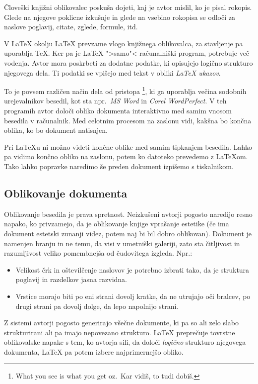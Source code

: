 Človeški knjižni oblikovalec poskuša dojeti, kaj je avtor mislil, 
ko je pisal rokopis. Glede na njegove poklicne izkušnje in glede na 
vsebino rokopisa 
se odloči za naslove poglavij, citate, zglede, formule, itd.

V \LaTeX{} okolju \LaTeX{} prevzame vlogo knjižnega oblikovalca, za stavljenje
pa uporablja \TeX{}. Ker pa je \LaTeX{}  ">samo"< računalniški program, 
potrebuje več vodenja. Avtor mora poskrbeti za dodatne podatke, ki opisujejo 
logično strukturo njegovega dela. Ti podatki se vpišejo med tekst v obliki 
 \emph{\LaTeX{} ukazov}.

To je povsem različen način dela od pristopa \footnote{What you see is
  what you get oz.~Kar vidiš, to tudi dobiš.}, ki ga uporablja večina sodobnih urejevalnikov besedil,
  kot sta npr.~\emph{MS Word} in \emph{Corel WordPerfect}. 
  V teh programih avtor določi
  obliko dokumenta interaktivno med samim vnosom besedila v računalnik. Med celotnim procesom
  na zaslonu vidi, kakšna bo končna oblika, ko bo dokument natisnjen.

Pri \LaTeX{}u ni možno videti končne oblike med samim tipkanjem 
besedila. Lahko pa vidimo končno obliko na zaslonu, potem ko datoteko 
prevedemo
z \LaTeX{}om. Tako lahko popravke naredimo še preden dokument izpišemo
s tiskalnikom.

\subsection{Oblikovanje dokumenta}

Oblikovanje besedila je prava spretnost. Neizkušeni avtorji pogosto naredijo
resno napako, ko privzamejo, da je oblikovanje knjige vprašanje estetike
(če ima dokument estetski zunanji videz, potem naj bi bil dobro oblikovan).
Dokument je namenjen branju in ne temu, da visi v 
umetniški galeriji, zato sta čitljivost in razumljivost veliko pomembnejša
od čudovitega izgleda.
Npr.: 
\begin{itemize}
\item Velikost črk in oštevilčenje naslovov je potrebno izbrati tako,
       da je struktura poglavij in razdelkov jasna razvidna.
\item Vrstice morajo biti po eni strani dovolj kratke, da ne utrujajo oči 
       bralcev, po drugi strani pa dovolj dolge, da lepo napolnijo strani.
\end{itemize}

Z  sistemi avtorji pogosto generirajo všečne dokumente, 
ki pa so ali zelo slabo strukturirani ali pa imajo nepovezano strukturo.
\LaTeX{} preprečuje tovrstne oblikovalske napake s tem, ko avtorja sili,
da določi \emph{logično} strukturo njegovega dokumenta, \LaTeX{} pa potem 
izbere najprimernejšo obliko.

